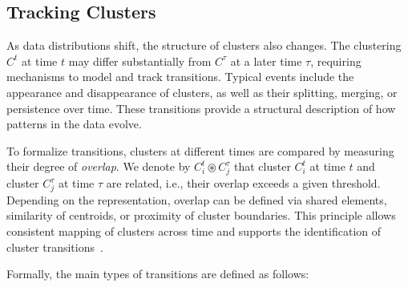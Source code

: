 \subsection{Tracking Clusters}\label{subsec:prob_tracking_clusters}

As data distributions shift, the structure of clusters also changes. The
clustering $C^t$ at time $t$ may differ substantially from $C^\tau$ at a later
time $\tau$, requiring mechanisms to model and track transitions. Typical
events include the appearance and disappearance of clusters, as well as their
splitting, merging, or persistence over time. These transitions provide a
structural description of how patterns in the data evolve.

To formalize transitions, clusters at different times are compared by measuring
their degree of \emph{overlap}. We denote by $C_i^t \circledast C_j^\tau$ that
cluster $C_i^t$ at time $t$ and cluster $C_j^\tau$ at time $\tau$ are related,
i.e., their overlap exceeds a given threshold. Depending on the representation,
overlap can be defined via shared elements, similarity of centroids, or
proximity of cluster boundaries. This principle allows consistent mapping of
clusters across time and supports the identification of cluster transitions~\cite{mec}.

Formally, the main types of transitions are defined as follows:

